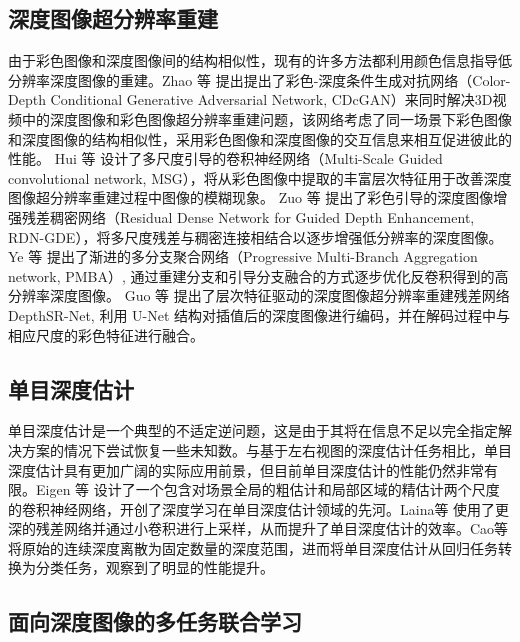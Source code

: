 \subsection{深度图像超分辨率重建}

由于彩色图像和深度图像间的结构相似性，现有的许多方法都利用颜色信息指导低分辨率深度图像的重建。Zhao 等 \cite{DBLP:journals/corr/abs-1708-09105} 提出提出了彩色-深度条件生成对抗网络（Color-Depth Conditional Generative Adversarial Network, CDcGAN）来同时解决3D视频中的深度图像和彩色图像超分辨率重建问题，该网络考虑了同一场景下彩色图像和深度图像的结构相似性，采用彩色图像和深度图像的交互信息来相互促进彼此的性能。 Hui 等 \cite{HuiLT16} 设计了多尺度引导的卷积神经网络（Multi-Scale Guided convolutional network, MSG），将从彩色图像中提取的丰富层次特征用于改善深度图像超分辨率重建过程中图像的模糊现象。 Zuo 等 \cite{DBLP:journals/isci/ZuoFYSW19} 提出了彩色引导的深度图像增强残差稠密网络（Residual Dense Network for Guided Depth Enhancement, RDN-GDE），将多尺度残差与稠密连接相结合以逐步增强低分辨率的深度图像。 Ye 等 \cite{DBLP:journals/tip/YeSWYXLL20} 提出了渐进的多分支聚合网络（Progressive Multi-Branch Aggregation network, PMBA）, 通过重建分支和引导分支融合的方式逐步优化反卷积得到的高分辨率深度图像。 Guo 等 \cite{DBLP:journals/tip/GuoLGCFH19} 提出了层次特征驱动的深度图像超分辨率重建残差网络 DepthSR-Net, 利用 U-Net 结构对插值后的深度图像进行编码，并在解码过程中与相应尺度的彩色特征进行融合。

\subsection{单目深度估计}

单目深度估计是一个典型的不适定逆问题，这是由于其将在信息不足以完全指定解决方案的情况下尝试恢复一些未知数。与基于左右视图的深度估计任务相比，单目深度估计具有更加广阔的实际应用前景，但目前单目深度估计的性能仍然非常有限。Eigen 等 \cite{DBLP:conf/nips/EigenPF14} 设计了一个包含对场景全局的粗估计和局部区域的精估计两个尺度的卷积神经网络，开创了深度学习在单目深度估计领域的先河。Laina等 \cite{DBLP:conf/3dim/LainaRBTN16} 使用了更深的残差网络并通过小卷积进行上采样，从而提升了单目深度估计的效率。Cao等 \cite{DBLP:journals/tcsv/CaoWS18} 将原始的连续深度离散为固定数量的深度范围，进而将单目深度估计从回归任务转换为分类任务，观察到了明显的性能提升。

\subsection{面向深度图像的多任务联合学习}

